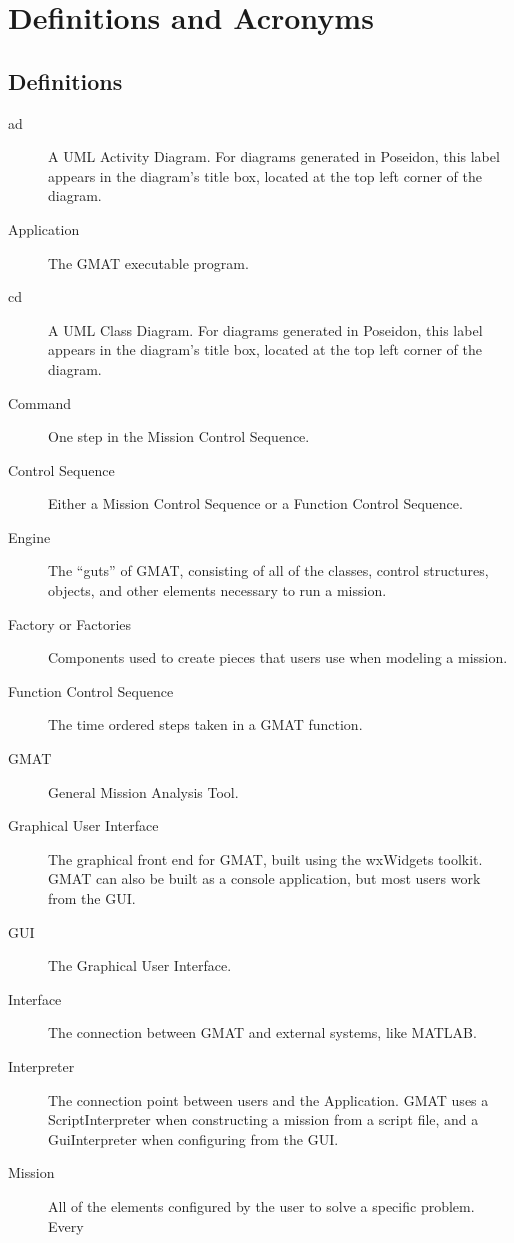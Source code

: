 \chapter{Definitions and Acronyms}


\section{Definitions}

\begin{description}
\item[ad] A UML Activity Diagram.  For diagrams generated in Poseidon, this label appears in the
diagram's title box, located at the top left corner of the diagram.
\item[Application] The GMAT executable program.
\item[cd] A UML Class Diagram.  For diagrams generated in Poseidon, this label appears in the
diagram's title box, located at the top left corner of the diagram.
\item[Command] One step in the Mission Control Sequence.
\item[Control Sequence] Either a Mission Control Sequence or a Function Control Sequence.
\item[Engine] The ``guts'' of GMAT, consisting of all of the classes, control structures, objects,
and other elements necessary to run a mission.
\item[Factory or Factories] Components used to create pieces that users use when modeling a mission.
\item[Function Control Sequence] The time ordered steps taken in a GMAT function.
\item[GMAT] General Mission Analysis Tool.
\item[Graphical User Interface] The graphical front end for GMAT, built using the wxWidgets
toolkit.  GMAT can also be built as a console application, but most users work from the GUI.
\item[GUI] The Graphical User Interface.
\item[Interface] The connection between GMAT and external systems, like MATLAB.
\item[Interpreter] The connection point between users and the Application.  GMAT uses a
ScriptInterpreter when constructing a mission from a script file, and a GuiInterpreter when
configuring from the GUI.
\item[Mission] All of the elements configured by the user to solve a specific problem.  Every

\end{description}

